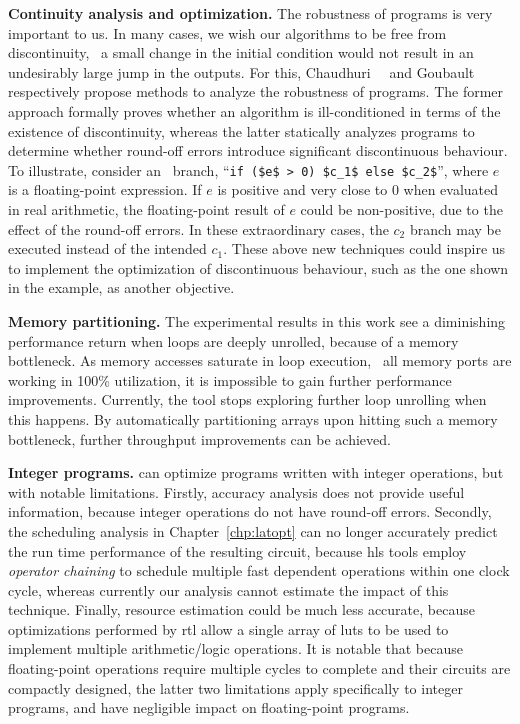 \textbf{Continuity analysis and optimization.} The robustness of programs
is very important to us.  In many cases, we wish our algorithms to be
free from discontinuity, \ie~a small change in the initial condition
would not result in an undesirably large jump in the outputs.  For this,
Chaudhuri~\etal~\cite{chaudhuri11} and Goubault~\etal~\cite{goubault13}
respectively propose methods to analyze the robustness of programs.  The
former approach formally proves whether an algorithm is ill-conditioned
in terms of the existence of discontinuity, whereas the latter statically
analyzes programs to determine whether round-off errors introduce significant
discontinuous behaviour.  To illustrate, consider an \iflit~branch,
``\lstinline[basicstyle=\tt]{if ($e$ > 0) $c_1$ else $c_2$}'', where $e$
is a floating-point expression.  If $e$ is positive and very close to
$0$ when evaluated in real arithmetic, the floating-point result of $e$
could be non-positive, due to the effect of the round-off errors.  In
these extraordinary cases, the $c_2$ branch may be executed instead of the
intended $c_1$.  These above new techniques could inspire us to implement the
optimization of discontinuous behaviour, such as the one shown in the example,
as another objective.

\textbf{Memory partitioning.} The experimental results in this work see a
diminishing performance return when loops are deeply unrolled, because of a
memory bottleneck.  As memory accesses saturate in loop execution, \ie~all
memory ports are working in 100\% utilization, it is impossible to gain further
performance improvements.  Currently, the tool stops exploring further loop
unrolling when this happens.  By automatically partitioning arrays upon hitting
such a memory bottleneck, further throughput improvements can be achieved.

\textbf{Integer programs.} \soap{} can optimize programs written with integer
operations, but with notable limitations.  Firstly, accuracy analysis does not
provide useful information, because integer operations do not have round-off
errors.  Secondly, the scheduling analysis in Chapter~\ref{chp:latopt} can no
longer accurately predict the run time performance of the resulting circuit,
because \gls{hls} tools employ \emph{operator chaining} to schedule multiple
fast dependent operations within one clock cycle, whereas currently our
analysis cannot estimate the impact of this technique.  Finally, resource
estimation could be much less accurate, because optimizations performed by
\gls{rtl} allow a single array of \glspl{lut} to be used to implement multiple
arithmetic/logic operations.  It is notable that because floating-point
operations require multiple cycles to complete and their circuits are compactly
designed, the latter two limitations apply specifically to integer programs,
and have negligible impact on floating-point programs.

